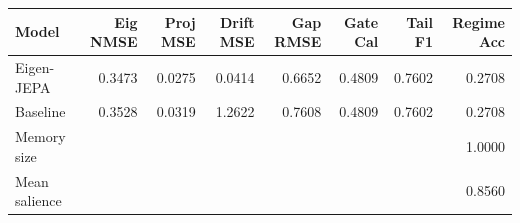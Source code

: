 \begin{tabular}{lrrrrrrr}
\toprule
Model & Eig NMSE & Proj MSE & Drift MSE & Gap RMSE & Gate Cal & Tail F1 & Regime Acc \\
\midrule
Eigen-JEPA & 0.3473 & 0.0275 & 0.0414 & 0.6652 & 0.4809 & 0.7602 & 0.2708 \\
Baseline & 0.3528 & 0.0319 & 1.2622 & 0.7608 & 0.4809 & 0.7602 & 0.2708 \\
\midrule
Memory size & \multicolumn{7}{r}{1.0000} \\
Mean salience & \multicolumn{7}{r}{0.8560} \\
\bottomrule
\end{tabular}